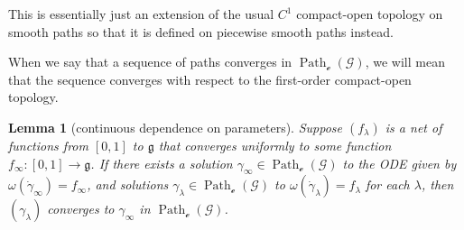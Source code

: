 \documentclass[10pt,a4paper]{amsart}
\numberwithin{equation}{section}
\newtheorem{Lemma}[Theorem]{Lemma}
\theoremstyle{definition}
\DeclareMathOperator{\Path}{Path}
\begin{document}
This is essentially just an extension of the usual $C^1$ compact-open topology on smooth paths so that it is defined on piecewise smooth paths instead.

When we say that a sequence of paths converges in $\Path_\mathscr{e}(\mathscr{G})$, we will mean that the sequence converges with respect to the first-order compact-open topology.

\begin{Lemma}[continuous dependence on parameters]\label{cdop} Suppose $(f_\lambda)$ is a net of functions from $[0,1]$ to $\mathfrak{g}$ that converges uniformly to some function $f_\infty\colon [0,1]\to\mathfrak{g}$. If there exists a solution $\gamma_\infty\in\Path_\mathscr{e}(\mathscr{G})$ to the ODE given by $\omega(\dot{\gamma}_\infty)=f_\infty$, and solutions $\gamma_\lambda\in\Path_\mathscr{e}(\mathscr{G})$ to $\omega(\dot{\gamma}_\lambda)=f_\lambda$ for each $\lambda$, then $(\gamma_\lambda)$ converges to $\gamma_\infty$ in $\Path_\mathscr{e}(\mathscr{G})$.\end{Lemma}
\end{document}
